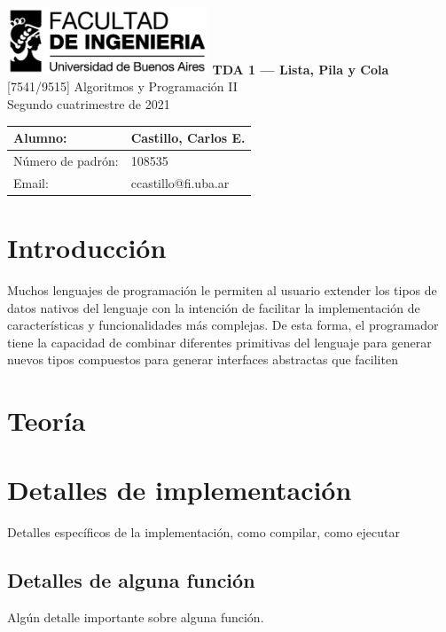 \documentclass[titlepage,a4paper]{article}
\makeatletter
\newcommand{\FirstName}{Carlos E.}
\newcommand{\LastName}{Castillo}
\newcommand{\StudentID}{108535}
\newcommand{\StudentEmail}{ccastillo@fi.uba.ar}
\newcommand{\ProjectName}{TDA 1 — Lista, Pila y Cola}
\makeatother
\begin{document}
\begin{titlepage}
	\hfill\includegraphics[width=6cm]{logofiuba.jpg}
    \centering
    \vfill
    \Huge \textbf{\ProjectName}
    \vskip2cm
    \Large [7541/9515] Algoritmos y Programación II\\
    Segundo cuatrimestre de 2021 
    \vfill
    \begin{tabular}{ | l | l | }
      \hline
      Alumno: & \LastName, \FirstName \\ \hline
      Número de padrón: & \StudentID \\ \hline
      Email: & \StudentEmail \\ \hline
  	\end{tabular}
    \vfill
    \vfill
\end{titlepage}

\tableofcontents
\newpage

\section{Introducción}\label{sec:intro}

Muchos lenguajes de programación le permiten al usuario extender los tipos de datos nativos del lenguaje con la intención de facilitar la implementación de características y funcionalidades más complejas. 
De esta forma, el programador tiene la capacidad de combinar diferentes primitivas del lenguaje para generar nuevos tipos compuestos para generar interfaces abstractas que faciliten 

\section{Teoría}\label{sec:teoria}

\section{Detalles de implementación}\label{sec:implementacion}

Detalles específicos de la implementación, como compilar, como ejecutar



\subsection{Detalles de alguna función}
Algún detalle importante sobre alguna función.
\end{document}
